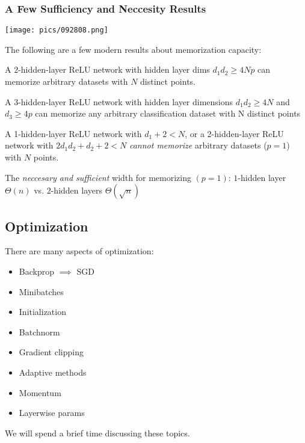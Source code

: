 \documentclass[11pt]{scrartcl}
\begin{document}
\subsubsection{A Few Sufficiency and Neccesity Results}
\begin{center}
    \texttt{[image: pics/092808.png]}
\end{center}
The following are a few modern results about memorization capacity:
\begin{thm}
A $2$-hidden-layer ReLU network with hidden layer dims $d_1d_2 \ge 4Np$ can memorize arbitrary datasets with $N$ distinct points.
\end{thm}

\begin{prop}
A $3$-hidden-layer ReLU network with hidden layer dimensions $d_1d_2 \ge 4N$ and $d_3 \ge 4p$ can memorize any arbitrary classification dataset with N distinct points 
\end{prop}

\begin{thm}
A 1-hidden-layer ReLU network with $d_1+2<N$, or a 2-hidden-layer ReLU network with $2d_1d_2+d_2+2 < N$ \textit{cannot memorize} arbitrary datasets ($p = 1$) with $N$ points.
\end{thm}

\begin{thm}
The \textit{neccesary and sufficient} width for memorizing $(p=1)$: $1$-hidden layer $\Theta(n)$ vs. $2$-hidden layers $\Theta(\sqrt{n})$
\end{thm}
\subsection{Optimization}
There are many aspects of optimization: 
\begin{itemize}
    \item Backprop $\implies$ SGD
    \item Minibatches
    \item Initialization
    \item Batchnorm
    \item Gradient clipping
    \item Adaptive methods
    \item Momentum
    \item Layerwise params
\end{itemize}
We will spend a brief time discussing these topics. 
\end{document}
